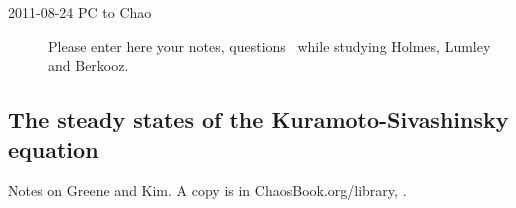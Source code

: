 \begin{description}

\item[2011-08-24 PC to Chao]
Please enter here your notes, questions \etc\ while studying
Holmes, Lumley and Berkooz.

\end{description}

\subsection{The steady states of the {Kuramoto-Sivashinsky} equation}
\label{s:ksgreene88}

Notes on Greene and Kim. A copy is in ChaosBook.org/library,
.

